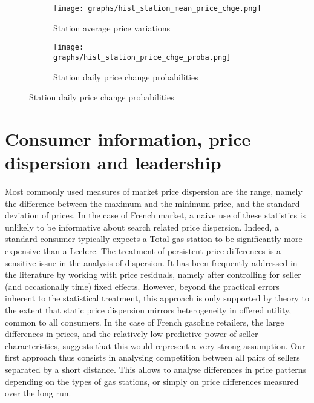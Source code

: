 \documentclass[english]{article}
\begin{document}
\begin{figure}[htb!]
\centering
\caption{Histograms of price change frequencies and values}
\begin{subfigure}{.49\textwidth}
\centering
\texttt{[image: graphs/hist\_station\_mean\_price\_chge.png]}
\caption[short]{Station average price variations}
\label{fig:hist_station_mean_price_chge}
\end{subfigure}
\begin{subfigure}{.49\textwidth}
\centering
\texttt{[image: graphs/hist\_station\_price\_chge\_proba.png]}
\caption[short]{Station daily price change probabilities}
\label{fig:hist_station_price_chge_proba}
\end{subfigure}
\end{figure}

\section{Consumer information, price dispersion and leadership}

Most commonly used measures of market price dispersion are the range, namely the difference between the maximum and the minimum price, and the standard deviation of prices. In the case of French market, a naive use of these statistics is unlikely to be informative about search related price dispersion. Indeed, a standard consumer typically expects a Total gas station to be significantly more expensive than a Leclerc. The treatment of persistent price differences is a sensitive issue in the analysis of dispersion. It has been frequently addressed in the literature by working with price residuals, namely after controlling for seller (and occasionally time) fixed effects. However, beyond the practical errors inherent to the statistical treatment, this approach is only supported by theory to the extent that static price dispersion mirrors heterogeneity in offered utility, common to all consumers. In the case of French gasoline retailers, the large differences in prices, and the relatively low predictive power of seller characteristics, suggests that this would represent a very strong assumption. Our first approach thus consists in analysing competition between all pairs of sellers separated by a short distance. This allows to analyse differences in price patterns depending on the types of gas stations, or simply on price differences measured over the long run.
\end{document}
